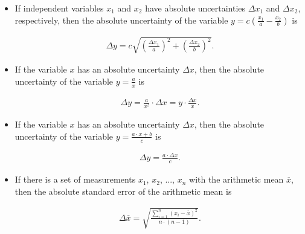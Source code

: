 \begin{itemize}

\item If independent variables $x_{1}$ and $x_{2}$ have absolute uncertainties $\Delta x_{1}$ and $\Delta x_{2}$, respectively, then the absolute uncertainty of the variable $y=c(\frac{x_{1}}{a} - \frac{x_{2}}{b})$ is

\begin{equation}
\begin{aligned}
\Delta y = c\sqrt{\left (\frac{ \Delta x_{1}}{a} \right )^{2} + \left (\frac{ \Delta x_{2}}{b} \right )^{2}}.
\label{eq:err_subtr}
\end{aligned}
\end{equation}


\item If the variable $x$ has an absolute uncertainty $\Delta x$, then the absolute uncertainty of the variable $y=\frac{a}{x}$ is

\begin{equation}
\begin{aligned}
\Delta y = \frac{a}{x^{2}}\cdot \Delta x = y\cdot \frac{\Delta x}{x}.
\label{eq:err_frac}
\end{aligned}
\end{equation}


\item If the variable $x$ has an absolute uncertainty $\Delta x$, then the absolute uncertainty of the variable $y=\frac{a\cdot x +b}{c}$ is

\begin{equation}
\begin{aligned}
\Delta y = \frac{a\cdot \Delta x}{c}.
\label{eq:err_prod}
\end{aligned}
\end{equation}



\item If there is a set of measurements $x_{1}$, $x_{2}$, ..., $x_{n}$ with the arithmetic mean $\overline{x}$, then the absolute standard error of the arithmetic mean is

 
\begin{equation}
\begin{aligned}
\Delta \overline{x} = \sqrt{\frac{\sum\limits_{i=1}^{n} (x_{i}-\overline{x})^{2}}{n\cdot(n-1)}}.
\label{eq:err_arith_mean}
\end{aligned}
\end{equation}

\end{itemize}



